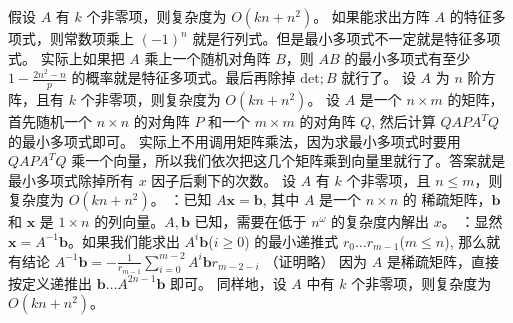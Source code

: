 {}假设 $A$ 有 $k$ 个非零项，则复杂度为 $O(kn + n^2)$。\markdownRendererInterblockSeparator
{}
\markdownRendererSectionEnd \markdownRendererSectionBegin
{}\markdownRendererInterblockSeparator
{}如果能求出方阵 $A$ 的特征多项式，则常数项乘上 $(-1)^n$ 就是行列式。但是最小多项式不一定就是特征多项式。\markdownRendererParagraphSeparator
{}实际上如果把 $A$ 乘上一个随机对角阵 $B$，则 $AB$ 的最小多项式有至少 $1 - \frac {2n^2 - n} p$ 的概率就是特征多项式。最后再除掉 $\text{det};B$ 就行了。\markdownRendererParagraphSeparator
{}设 $A$ 为 $n$ 阶方阵，且有 $k$ 个非零项，则复杂度为 $O(kn + n ^ 2)$。\markdownRendererInterblockSeparator
{}
\markdownRendererSectionEnd \markdownRendererSectionBegin
{}\markdownRendererInterblockSeparator
{}设 $A$ 是一个 $n\times m$ 的矩阵，首先随机一个 $n\times n$ 的对角阵 $P$ 和一个 $m\times m$ 的对角阵 $Q$, 然后计算 $Q A P A^T Q$ 的最小多项式即可。\markdownRendererParagraphSeparator
{}实际上不用调用矩阵乘法，因为求最小多项式时要用 $Q A P A^T Q$ 乘一个向量，所以我们依次把这几个矩阵乘到向量里就行了。答案就是最小多项式除掉所有 $x$ 因子后剩下的次数。\markdownRendererParagraphSeparator
{}设 $A$ 有 $k$ 个非零项，且 $n \le m$，则复杂度为 $O(kn + n ^ 2)$。\markdownRendererInterblockSeparator
{}
\markdownRendererSectionEnd \markdownRendererSectionBegin
{}\markdownRendererInterblockSeparator
{}：已知 $A \mathbf x = \mathbf b$, 其中 $A$ 是一个 $n \times n$ 的  稀疏矩阵，$\mathbf b$ 和 $\mathbf x$ 是 $1\times n$ 的列向量。$A, \mathbf b$ 已知，需要在低于 $n^\omega$ 的复杂度内解出 $x$。\markdownRendererParagraphSeparator
{}：显然 $\mathbf x = A^{-1} \mathbf b$。如果我们能求出 ${A^i \mathbf b}$($i \ge 0$) 的最小递推式 ${r_0 \dots r_{m - 1}}$($m \le n$), 那么就有结论\markdownRendererParagraphSeparator
{}$A^{-1} \mathbf b = -\frac 1 {r_{m - 1}} \sum_{i = 0} ^ {m - 2} A^i \mathbf b r_{m - 2 - i}$\markdownRendererParagraphSeparator
{}（证明略）\markdownRendererParagraphSeparator
{}因为 $A$ 是稀疏矩阵，直接按定义递推出 $\mathbf b \dots A^{2n - 1} \mathbf b$ 即可。\markdownRendererParagraphSeparator
{}同样地，设 $A$ 中有 $k$ 个非零项，则复杂度为 $O(kn + n^2)$。\markdownRendererInterblockSeparator
{}
\markdownRendererSectionEnd 
\markdownRendererSectionEnd \markdownRendererSectionBegin
{}\markdownRendererInterblockSeparator
{}\markdownRendererInterblockSeparator
